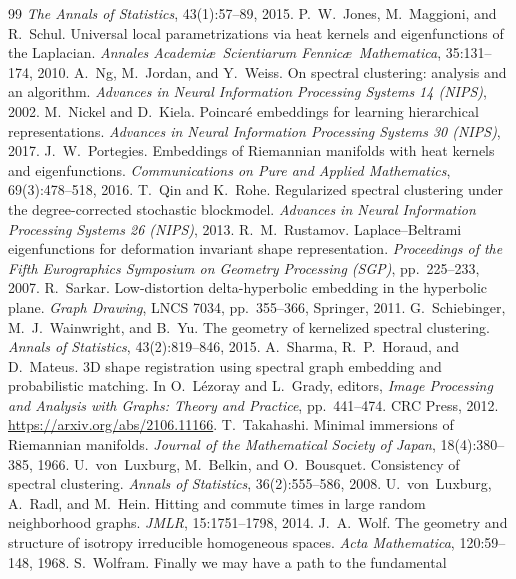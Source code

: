 \documentclass[11pt]{article}
\theoremstyle{remark}
\begin{document}
\begin{thebibliography}{99}
\emph{The Annals of Statistics}, 43(1):57--89, 2015.
 P.~W.~Jones, M.~Maggioni, and R.~Schul. Universal local
parametrizations via heat kernels and eigenfunctions of the Laplacian.
\emph{Annales Academi\ae\ Scientiarum Fennic\ae\ Mathematica}, 35:131--174, 2010.
 A.~Ng, M.~Jordan, and Y.~Weiss. On spectral clustering:
analysis and an algorithm. \emph{Advances in Neural Information
Processing Systems 14 (NIPS)}, 2002.
 M.~Nickel and D.~Kiela. Poincar\'e embeddings for learning
hierarchical representations. \emph{Advances in Neural Information
Processing Systems 30 (NIPS)}, 2017.
 J.~W.~Portegies. Embeddings of Riemannian manifolds
with heat kernels and eigenfunctions. \emph{Communications on Pure and Applied
Mathematics}, 69(3):478--518, 2016.
 T.~Qin and K.~Rohe. Regularized spectral clustering
under the degree-corrected stochastic blockmodel. \emph{Advances in Neural
Information Processing Systems 26 (NIPS)}, 2013.
 R.~M.~Rustamov. Laplace--Beltrami eigenfunctions for
deformation invariant shape representation. \emph{Proceedings of the Fifth
Eurographics Symposium on Geometry Processing (SGP)}, pp.~225--233, 2007.
 R.~Sarkar. Low-distortion delta-hyperbolic embedding in the
hyperbolic plane. \emph{Graph Drawing}, LNCS 7034, pp.~355--366, Springer,
2011.
 G.~Schiebinger, M.~J.~Wainwright, and B.~Yu. The
geometry of kernelized spectral clustering. \emph{Annals of Statistics},
43(2):819--846, 2015.
 A.~Sharma, R.~P.~Horaud, and D.~Mateus. 3D shape
registration using spectral graph embedding and probabilistic matching. In
O.~L\'ezoray and L.~Grady, editors, \emph{Image Processing and Analysis with
Graphs: Theory and Practice}, pp.~441--474. CRC Press, 2012.
\url{https://arxiv.org/abs/2106.11166}.
 T.~Takahashi. Minimal immersions of Riemannian
manifolds. \emph{Journal of the Mathematical Society of Japan},
18(4):380--385, 1966.
 U.~von~Luxburg, M.~Belkin, and O.~Bousquet.
Consistency of spectral clustering. \emph{Annals of Statistics},
36(2):555--586, 2008.
 U.~von~Luxburg, A.~Radl, and M.~Hein. Hitting and
commute times in large random neighborhood graphs. \emph{JMLR},
15:1751--1798, 2014.
 J.~A.~Wolf. The geometry and structure of isotropy
irreducible homogeneous spaces. \emph{Acta Mathematica}, 120:59--148, 1968.
 S.~Wolfram. Finally we may have a path to the fundamental

\end{thebibliography}
\end{document}
